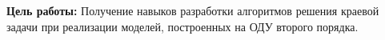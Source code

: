 \Introduction

\textbf{Цель работы:} Получение навыков разработки алгоритмов решения краевой задачи при реализации моделей, построенных на ОДУ второго порядка.
